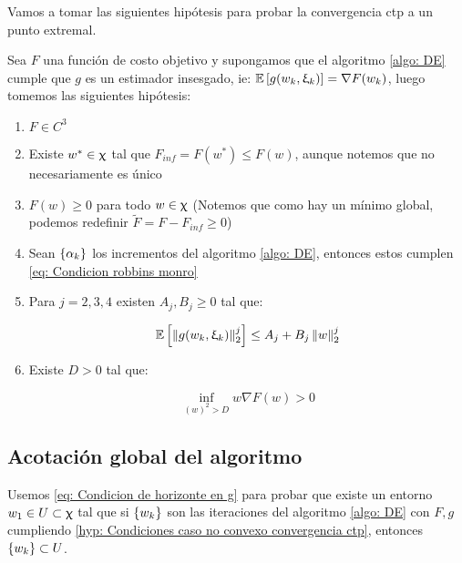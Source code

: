Vamos a tomar las siguientes hip\'otesis para probar la convergencia ctp a un punto extremal.

\begin{hyp}
	\label{hyp: Condiciones caso no convexo convergencia ctp}
	Sea $F$ una funci\'on de costo objetivo y supongamos que el algoritmo \ref{algo: DE} cumple que $g$ es un estimador insesgado, ie: $\mathbb{E} \left[g(w_k, \upxi_{k})\right] = \nabla F(w_k)$, luego tomemos las siguientes hip\'otesis:
	
	\begin{enumerate}
		\item $F \in C^3$
		\item Existe $w^* \in \upchi$ tal que $F_{inf} = F(w^*) \leq F(w)$, aunque notemos que no necesariamente es \'unico
		\item $F(w) \geq 0$ para todo $w \in \upchi$ (Notemos que como hay un m\'inimo global, podemos redefinir $\widetilde{F} = F - F_{inf} \geq 0$)
		\item Sean $\left\lbrace\alpha_k\right\rbrace$ los incrementos del algoritmo \ref{algo: DE}, entonces estos cumplen \ref{eq: Condicion robbins monro}
		\item Para $j = 2, 3, 4$ existen $A_j,B_j \geq 0$ tal que:
		
		\begin{equation}
			\label{eq: Acotaciones momentos de g}
			\mathbb{E} \left[\left\lVert g(w_k, \upxi_{k})\right\rVert_2^j\right] \leq A_j + B_j \left\lVert w\right\rVert_2^j
		\end{equation}
		
		\item  Existe $D > 0$ tal que:
		
		\begin{equation}
			\label{eq: Condicion de horizonte en g}
			\inf\limits_{(w)^2 > D} {w \nabla F(w)} >0
		\end{equation}
	\end{enumerate}
	
\end{hyp}

\subsection{Acotaci\'on global del algoritmo}

Usemos \ref{eq: Condicion de horizonte en g} para probar que existe un entorno $w_1 \in U \subset \upchi$ tal que si $\left\lbrace w_k\right\rbrace$ son las iteraciones del algoritmo \ref{algo: DE} con $F,g$ cumpliendo \ref{hyp: Condiciones caso no convexo convergencia ctp}, entonces $\left\lbrace w_k\right\rbrace \subset U$.

